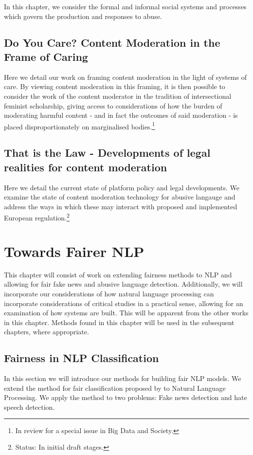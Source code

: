 In this chapter, we consider the formal and informal social systems and processes which govern the production and responses to abuse.

\subsection{Do You Care? Content Moderation in the Frame of Caring}
Here we detail our work on framing content moderation in the light of systems of care. By viewing content moderation in this framing, it is then possible to consider the work of the content moderator in the tradition of intersectional feminist scholarship, giving access to considerations of how the burden of moderating harmful content - and in fact the outcomes of said moderation - is placed disproportionately on marginalised bodies.\footnote{In review for a special issue in Big Data and Society.}

\subsection{That is the Law - Developments of legal realities for content moderation}
Here we detail the current state of platform policy and legal developments. We examine the state of content moderation technology for abusive langauge and address the ways in which these may interact with proposed and implemented European regulation.\footnote{Status: In initial draft stages.}

\section{Towards Fairer NLP}

This chapter will consist of work on extending fairness methods to NLP and allowing for fair fake news and abusive language detection. Additionally, we will incorporate our considerations of how natural language processing can incorporate considerations of critical studies in a practical sense, allowing for an examination of how systems are built. This will be apparent from the other works in this chapter. Methods found in this chapter will be used in the subsequent chapters, where appropriate.

\subsection{Fairness in NLP Classification}

In this section we will introduce our methods for building fair NLP models. We extend the method for fair classification proposed by \citep{Agarwal:2018} to Natural Language Processing. We apply the method to two problems: Fake news detection and hate speech detection.

